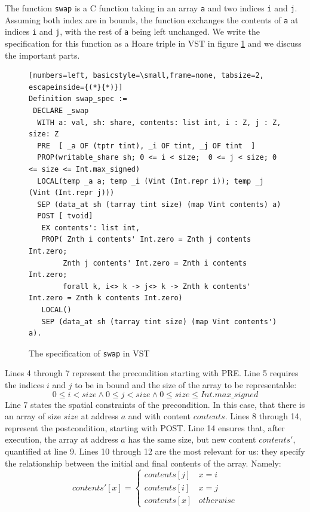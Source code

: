 \documentclass[onecolumn, preprint]{sigplanconf}
\begin{document}
The function \texttt{swap} is a C function taking in an array \texttt{a} and two indices \texttt{i} and \texttt{j}. Assuming both index are in bounds, the function exchanges the contents of \texttt{a} at indices \texttt{i} and \texttt{j}, with the rest of \texttt{a} being left unchanged. We write the specification for this function as a Hoare triple in VST in figure \ref{fig:hoarswap} and we discuss the important parts.

\begin{figure}
\begin{lstlisting}[numbers=left, basicstyle=\small,frame=none, tabsize=2, escapeinside={(*}{*)}]  
Definition swap_spec :=
 DECLARE _swap
  WITH a: val, sh: share, contents: list int, i : Z, j : Z, size: Z
  PRE  [ _a OF (tptr tint), _i OF tint, _j OF tint  ]
  PROP(writable_share sh; 0 <= i < size;  0 <= j < size; 0 <= size <= Int.max_signed)
  LOCAL(temp _a a; temp _i (Vint (Int.repr i)); temp _j (Vint (Int.repr j)))
  SEP (data_at sh (tarray tint size) (map Vint contents) a)
  POST [ tvoid]
   EX contents': list int,
   PROP( Znth i contents' Int.zero = Znth j contents Int.zero;
        Znth j contents' Int.zero = Znth i contents Int.zero;
        forall k, i<> k -> j<> k -> Znth k contents' Int.zero = Znth k contents Int.zero)
   LOCAL()
   SEP (data_at sh (tarray tint size) (map Vint contents') a).
\end{lstlisting}
\label{fig:hoarswap}
   \caption{The specification of \texttt{swap} in VST}
\end{figure}
Lines 4 through 7 represent the precondition starting with PRE. Line 5 requires the indices $i$ and $j$ to be in bound and the size of the array to be representable:
$$ 0 \leq i < size \wedge 0 \leq j < size  \wedge 0 \leq size \leq Int.max\_signed $$
Line 7 states the spatial constraints of the precondition. In this case, that there is an array of size $size$ at address $a$ and with content $contents$. Lines 8 through 14, represent the postcondition, starting with POST. Line 14 ensures that, after execution, the array at address $a$ has the same size, but new content $contents'$, quantified at line 9. Lines 10 through 12 are the most relevant for us: they specify the relationship between the initial and final contents of the array. Namely:
\begin{equation}
\label{eq:condition}
contents'[x] = \left\{\begin{array}{cc}contents[j] & x = i \\contents[i] & x = j \\contents[x] & otherwise\end{array}\right.
\end{equation}
\end{document}

